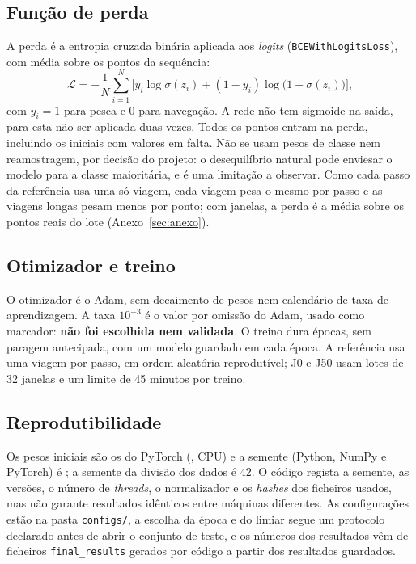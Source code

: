 \documentclass{article}
\newcommand{\revtext}[2]{{\color{#1}#2}}
\begin{document}
\subsection{\texorpdfstring{Função de perda}{Função de perda}}

\revtext{rev052}{A perda é a entropia cruzada binária aplicada aos \emph{logits} (\texttt{BCEWithLogitsLoss}), com média sobre os pontos da sequência:
\begin{equation}
\mathcal{L}=-\frac1N\sum_{i=1}^{N}\Big[y_i\log\sigma(z_i)+(1-y_i)\log\big(1-\sigma(z_i)\big)\Big],
\end{equation}
com $y_i=1$ para pesca e $0$ para navegação. A rede não tem sigmoide na saída, para esta não ser aplicada duas vezes. Todos os pontos entram na perda, incluindo os iniciais com valores em falta. Não se usam pesos de classe nem reamostragem, por decisão do projeto: o desequilíbrio natural pode enviesar o modelo para a classe maioritária, e é uma limitação a observar. Como cada passo da referência usa uma só viagem, cada viagem pesa o mesmo por passo e as viagens longas pesam menos por ponto; com janelas, a perda é a média sobre os pontos reais do lote (Anexo~\ref{sec:anexo}).}

\subsection{\texorpdfstring{Otimizador e treino}{Otimizador e treino}}

\revtext{rev052}{O otimizador é o Adam, sem decaimento de pesos nem calendário de taxa de aprendizagem. A taxa $10^{-3}$ é o valor por omissão do Adam, usado como marcador: \textbf{não foi escolhida nem validada}. O treino dura \resTrEpocas{} épocas, sem paragem antecipada, com um modelo guardado em cada época. A referência usa uma viagem por passo, em ordem aleatória reprodutível; J0 e J50 usam lotes de 32 janelas e um limite de 45 minutos por treino.}

\subsection{\texorpdfstring{Reprodutibilidade}{Reprodutibilidade}}

\revtext{rev052}{Os pesos iniciais são os do PyTorch (\resTrTorch{}, CPU) e a semente (Python, NumPy e PyTorch) é \resTrSemente{}; a semente da divisão dos dados é 42. O código regista a semente, as versões, o número de \emph{threads}, o normalizador e os \emph{hashes} dos ficheiros usados, mas não garante resultados idênticos entre máquinas diferentes. As configurações estão na pasta \texttt{configs/}, a escolha da época e do limiar segue um protocolo declarado antes de abrir o conjunto de teste, e os números dos resultados vêm de ficheiros \texttt{final\_results} gerados por código a partir dos resultados guardados.}
\end{document}
